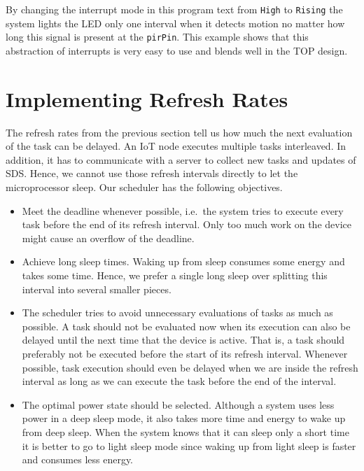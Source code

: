 \documentclass[runningheads]{llncs}
\newcommand{\CleanInline}[1]{\lstinline[language=Clean]!#1!}
\newcommand{\prog}[1]{\CleanInline{#1}}
\begin{document}
By changing the interrupt mode in this program text from \prog{High} to \prog{Rising} the system lights the LED only one interval when it detects motion no matter how long this signal is present at the \prog{pirPin}.
This example shows that this abstraction of interrupts is very easy to use and blends well in the TOP design.

\section{Implementing Refresh Rates}

The refresh rates from the previous section tell us how much the next evaluation of the task can be delayed.
An IoT node executes multiple tasks interleaved.
In addition, it has to communicate with a server to collect new tasks and updates of {SDS}.
Hence, we cannot use those refresh intervals directly to let the microprocessor sleep.
Our scheduler has the following objectives.
\begin{itemize}
	\item
		Meet the deadline whenever possible, i.e.\ the system tries to execute every task before the end of its refresh interval.
		Only too much work on the device might cause an overflow of the deadline.
	\item
		Achieve long sleep times. Waking up from sleep consumes some energy and takes some time.
		Hence, we prefer a single long sleep over splitting this interval into several smaller pieces.
	\item
		The scheduler tries to avoid unnecessary evaluations of tasks as much as possible.
		A task should not be evaluated now when its execution can also be delayed until the next time that the device is active.
		That is, a task should preferably not be executed before the start of its refresh interval.
		Whenever possible, task execution should even be delayed when we are inside the refresh interval as long as we can execute the task before the end of the interval.
	\item
		The optimal power state should be selected.
		Although a system uses less power in a deep sleep mode, it also takes more time and energy to wake up from deep sleep.
		When the system knows that it can sleep only a short time it is better to go to light sleep mode since waking up from light sleep is faster and consumes less energy.
\end{itemize}
\end{document}
